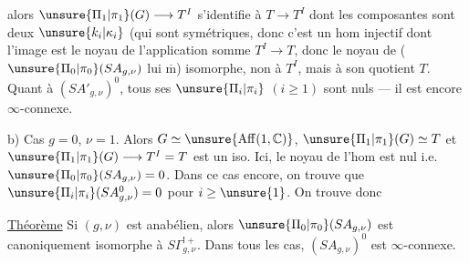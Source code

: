 

alors $\unsure{\Pi_1|\pi_1}(G)\longrightarrow T^I$ s'identifie à
$T\longrightarrow T^I$ dont les composantes sont  deux
$\unsure{k_i|\kappa_i}$ (qui sont symétriques, donc c'est un hom injectif dont l'image est le noyau de l'application somme
$T^I\longrightarrow T$, donc  le noyau de
( $\unsure{\Pi_0|\pi_0}(SA_{g,\nu})$ lui $\overline{\mathrm m}$)
 isomorphe, non à $T^I$, mais à son quotient $T$.
Quant à $(SA'_{g,\nu})^0$, tous ses $\unsure{\Pi_i|\pi_i}$ $(i\geq1)$ sont nuls --- il est encore $\infty$-connexe.

b) Cas $g=0$, $\nu=1$. Alors $G\simeq\unsure{\operatorname{Aff}(1,\mathbb C)}$,
$\unsure{\Pi_1|\pi_1}(G)\simeq T$ et
$\unsure{\Pi_1|\pi_1}(G)\longrightarrow T^I=T$ est un iso.
Ici,  le noyau de l'hom
est nul
i.e.  $\unsure{\Pi_0|\pi_0}(SA_{g,\nu})=0$.
Dans ce cas encore, on trouve que $\unsure{\Pi_i|\pi_i}(SA_{g,\nu}^0)=0$
pour  $i\geq\unsure{1}$. On trouve donc

\uline{Théorème} 
Si $(g,\nu)$ est anabélien, alors $\unsure{\Pi_0|\pi_0}(SA_{g,\nu})$ est canoniquement isomorphe à $S\Gamma_{g,\nu}^{!+}$.
Dans tous les cas, $(SA_{g,\nu})^0$ est $\infty$-connexe.

